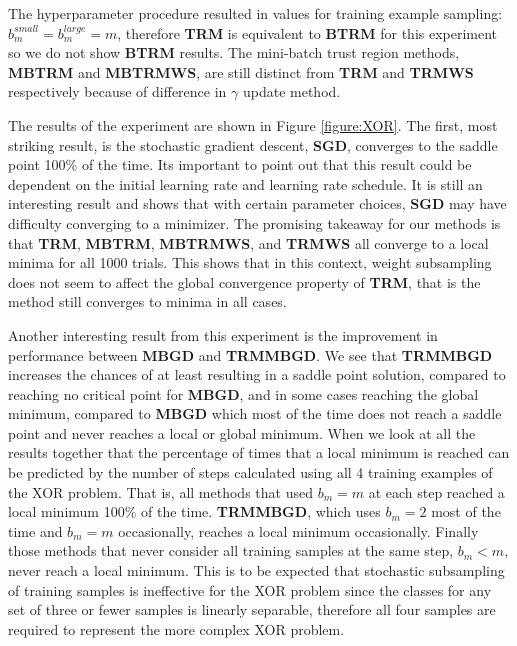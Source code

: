 \documentclass[letterpaper,12pt,titlepage,oneside,final]{book}
\begin{document}
	 The hyperparameter procedure resulted in values for training example sampling: $b_{m}^{small} = b_{m}^{large} = m$, therefore \textbf{TRM} is equivalent to \textbf{BTRM} for this experiment so we do not show \textbf{BTRM} results. The mini-batch trust region methods, \textbf{MBTRM} and \textbf{MBTRMWS}, are still distinct from \textbf{TRM} and \textbf{TRMWS} respectively because of difference in $\gamma$ update method.  
	
	The results of the experiment are shown in Figure \ref{figure:XOR}. The first, most striking result, is the stochastic gradient descent, \textbf{SGD}, converges to the saddle point 100\% of the time. Its important to point out that this result could be dependent on the initial learning rate and learning rate schedule. It is still an interesting result and shows that with certain parameter choices, \textbf{SGD} may have difficulty converging to a minimizer. The promising takeaway for our methods is that \textbf{TRM}, \textbf{MBTRM}, \textbf{MBTRMWS}, and \textbf{TRMWS} all converge to a local minima for all 1000 trials. This shows that in this context, weight subsampling does not seem to affect the global convergence property of \textbf{TRM}, that is the method still converges to minima in all cases. 
	
	Another interesting result from this experiment is the improvement in performance between \textbf{MBGD} and \textbf{TRMMBGD}. We see that \textbf{TRMMBGD} increases the chances of at least resulting in a saddle point solution, compared to reaching no critical point for \textbf{MBGD}, and in some cases reaching the global minimum, compared to \textbf{MBGD} which most of the time does not reach a saddle point and never reaches a local or global minimum. When we look at all the results together that the percentage of times that a local minimum is reached can be predicted by the number of steps calculated using all 4 training examples of the XOR problem. That is, all methods that used $b_{m} = m$ at each step reached a local minimum 100\% of the time. \textbf{TRMMBGD}, which uses $b_{m} = 2$ most of the time and $b_{m} = m$ occasionally, reaches a local minimum occasionally. Finally those methods that never consider all training samples at the same step, $b_{m} < m$, never reach a local minimum. This is to be expected that stochastic subsampling of training samples is ineffective for the XOR problem since the classes for any set of three or fewer samples is linearly separable, therefore all four samples are required to represent the more complex XOR problem.
	
\end{document}
